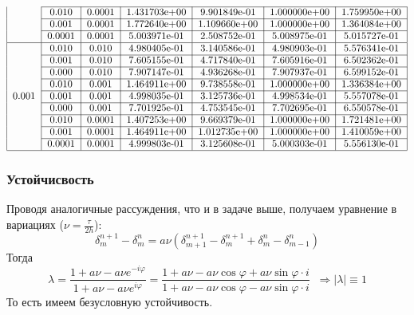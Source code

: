 \documentclass[a4paper,12pt]{article}
\begin{document}
\begin{align*}
\begin{tabular}{|c|c|c|c|c|c|c|}
            \cline{2-7}
            & 0.010 & 0.0001 & 1.431703e+00 & 9.901849e-01 & 1.000000e+00 & 1.759950e+00 \\
            \cline{2-7}
            & 0.001 & 0.0001 & 1.772640e+00 & 1.109660e+00 & 1.000000e+00 & 1.364084e+00 \\
            \cline{2-7}
            & 0.0001 & 0.0001 & 5.003971e-01 & 2.508752e-01 & 5.008975e-01 & 5.015727e-01 \\
            \hline
            & 0.010 & 0.010 & 4.980405e-01 & 3.140586e-01 & 4.980903e-01 & 5.576341e-01 \\
            \cline{2-7}
            & 0.001 & 0.010 & 7.605155e-01 & 4.717840e-01 & 7.605916e-01 & 6.502362e-01 \\
            \cline{2-7}
            & 0.000 & 0.010 & 7.907147e-01 & 4.936268e-01 & 7.907937e-01 & 6.599152e-01 \\
            \cline{2-7}
            & 0.010 & 0.001 & 1.464911e+00 & 9.738558e-01 & 1.000000e+00 & 1.336384e+00 \\
            \cline{2-7}
            0.001& 0.001 & 0.001 & 4.998035e-01 & 3.125736e-01 & 4.998534e-01 & 5.557078e-01 \\
            \cline{2-7}
            & 0.000 & 0.001 & 7.701925e-01 & 4.753545e-01 & 7.702695e-01 & 6.550578e-01 \\
            \cline{2-7}
            & 0.010 & 0.0001 & 1.407253e+00 & 9.669379e-01 & 1.000000e+00 & 1.721481e+00 \\
            \cline{2-7}
            & 0.001 & 0.0001 & 1.464911e+00 & 1.012735e+00 & 1.000000e+00 & 1.410059e+00 \\
            \cline{2-7}
            & 0.0001 & 0.0001 & 4.999803e-01 & 3.125608e-01 & 5.000303e-01 & 5.556130e-01 \\ 
            \hline
        \end{tabular}
    \end{align*}

\subsubsection{Устойчисвость}
Проводя аналогичные рассуждения, что и в задаче выше, получаем уравнение в вариациях ($\nu=\frac{\tau}{2h}$):
\[
    \delta^{n+1}_m-\delta^n_m=a \nu (\delta^{n+1}_{m+1}-\delta^{n+1}_m+\delta^n_m-\delta^n_{m-1})
\]
Тогда
\[
    \lambda=\frac{1+a\nu-a\nu e^{- i\varphi}}{1+a\nu-a\nu e^{i\varphi}}=\frac{1+a\nu-a\nu \cos{\varphi} +a\nu \sin{\varphi} \cdot i}{1+a\nu-a\nu \cos{\varphi} - a\nu \sin{\varphi} \cdot i} \;\; \Rightarrow |\lambda|\equiv 1
\]
То есть имеем безусловную устойчивость.
\end{document}
